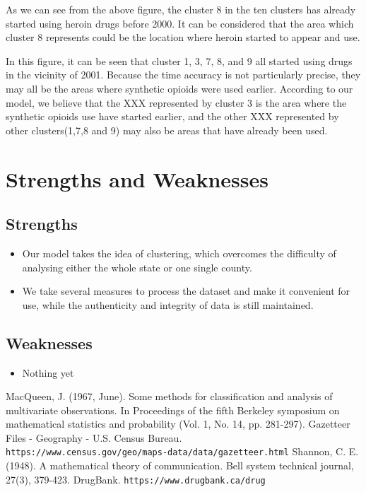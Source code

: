 \documentclass[11pt]{article}
\begin{document}
As we can see from the above figure, the cluster 8 in the ten clusters has already started using heroin drugs before 2000. It can be considered that the area which cluster 8 represents could be the location where heroin started to appear and use.

In this figure, it can be seen that cluster 1, 3, 7, 8, and 9 all started using drugs in the vicinity of 2001. Because the time accuracy is not particularly precise, they may all be the areas where synthetic opioids were used earlier. According to our model, we believe that the XXX represented by cluster 3 is the area where the synthetic opioids use have started earlier, and the other XXX represented by other clusters(1,7,8 and 9) may also be areas that have already been used.

\section{Strengths and Weaknesses}
\subsection{Strengths}
\begin{itemize}
    \item Our model takes the idea of clustering, which overcomes the difficulty of analysing either the whole state or one single county.
    \item We take several measures to process the dataset and make it convenient for use, while the authenticity and integrity of data is still maintained.
\end{itemize}

\subsection{Weaknesses}
\begin{itemize}
    \item Nothing yet
 \end{itemize}

\begin{thebibliography}{99}
MacQueen, J. (1967, June). Some methods for classification and analysis of multivariate observations. In Proceedings of the fifth Berkeley symposium on mathematical statistics and probability (Vol. 1, No. 14, pp. 281-297).
Gazetteer Files - Geography - U.S. Census Bureau. \texttt{\\https://www.census.gov/geo/maps-data/data/gazetteer.html}
Shannon, C. E. (1948). A mathematical theory of communication. Bell system technical journal, 27(3), 379-423.
DrugBank. \texttt{https://www.drugbank.ca/drug}
\end{thebibliography}
\end{document}
